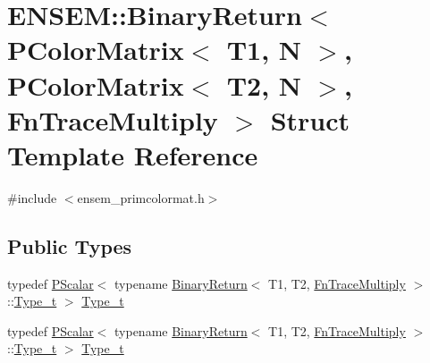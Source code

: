 \hypertarget{structENSEM_1_1BinaryReturn_3_01PColorMatrix_3_01T1_00_01N_01_4_00_01PColorMatrix_3_01T2_00_01N_01_4_00_01FnTraceMultiply_01_4}{}\section{E\+N\+S\+EM\+:\+:Binary\+Return$<$ P\+Color\+Matrix$<$ T1, N $>$, P\+Color\+Matrix$<$ T2, N $>$, Fn\+Trace\+Multiply $>$ Struct Template Reference}
\label{structENSEM_1_1BinaryReturn_3_01PColorMatrix_3_01T1_00_01N_01_4_00_01PColorMatrix_3_01T2_00_01N_01_4_00_01FnTraceMultiply_01_4}


{\ttfamily \#include $<$ensem\+\_\+primcolormat.\+h$>$}

\subsection*{Public Types}
\begin{DoxyCompactItemize}
\item 
typedef \mbox{\hyperlink{classENSEM_1_1PScalar}{P\+Scalar}}$<$ typename \mbox{\hyperlink{structENSEM_1_1BinaryReturn}{Binary\+Return}}$<$ T1, T2, \mbox{\hyperlink{structENSEM_1_1FnTraceMultiply}{Fn\+Trace\+Multiply}} $>$\+::\mbox{\hyperlink{structENSEM_1_1BinaryReturn_3_01PColorMatrix_3_01T1_00_01N_01_4_00_01PColorMatrix_3_01T2_00_01N_01_4_00_01FnTraceMultiply_01_4_af772cf98211eae0f62f1d9a9f5475c9e}{Type\+\_\+t}} $>$ \mbox{\hyperlink{structENSEM_1_1BinaryReturn_3_01PColorMatrix_3_01T1_00_01N_01_4_00_01PColorMatrix_3_01T2_00_01N_01_4_00_01FnTraceMultiply_01_4_af772cf98211eae0f62f1d9a9f5475c9e}{Type\+\_\+t}}
\item 
typedef \mbox{\hyperlink{classENSEM_1_1PScalar}{P\+Scalar}}$<$ typename \mbox{\hyperlink{structENSEM_1_1BinaryReturn}{Binary\+Return}}$<$ T1, T2, \mbox{\hyperlink{structENSEM_1_1FnTraceMultiply}{Fn\+Trace\+Multiply}} $>$\+::\mbox{\hyperlink{structENSEM_1_1BinaryReturn_3_01PColorMatrix_3_01T1_00_01N_01_4_00_01PColorMatrix_3_01T2_00_01N_01_4_00_01FnTraceMultiply_01_4_af772cf98211eae0f62f1d9a9f5475c9e}{Type\+\_\+t}} $>$ \mbox{\hyperlink{structENSEM_1_1BinaryReturn_3_01PColorMatrix_3_01T1_00_01N_01_4_00_01PColorMatrix_3_01T2_00_01N_01_4_00_01FnTraceMultiply_01_4_af772cf98211eae0f62f1d9a9f5475c9e}{Type\+\_\+t}}
\end{DoxyCompactItemize}


